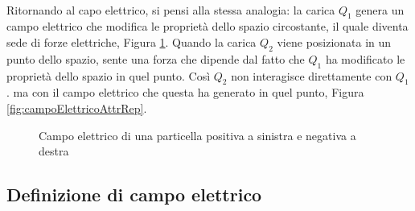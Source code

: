 \paragraph{}
Ritornando al capo elettrico, si pensi alla stessa analogia: la carica $Q_1$
 genera un campo elettrico che modifica le proprietà dello
spazio circostante, il quale diventa sede di forze elettriche, Figura \ref{fig:campoElettricoPosNeg}.
Quando la carica $Q_2$  viene posizionata in un punto dello spazio, sente una forza che dipende dal fatto che $Q_1$ ha
modificato le proprietà dello spazio in quel punto. Così $Q_2$
 non interagisce direttamente con $Q_1$.
 ma con il campo elettrico che questa ha generato in quel punto, Figura \ref{fig:campoElettricoAttrRep}.
 
 \def\R{1.8}
\def\NE{8}
\def\NV{4}
\contourlength{1.6pt}
 \begin{figure}[H]
     \centering
     \begin{minipage}[c]{0.4\textwidth}
     \centering
      \end{minipage}
     \hspace{0.1mm}
     \begin{minipage}[c]{0.4\textwidth}
        \centering
     \end{minipage}
     \caption{Campo elettrico di una particella positiva a sinistra e negativa a destra}
     \label{fig:campoElettricoPosNeg}
 \end{figure}
 
 \subsection{Definizione di campo elettrico}
 
